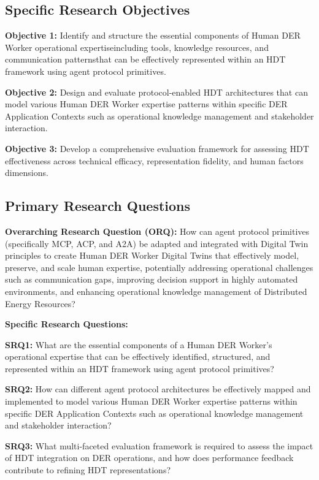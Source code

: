 \documentclass[12pt,a4paper]{article}
\newcommand{\emdash}{\textemdash}
\begin{document}
\subsection{Specific Research Objectives}

\textbf{Objective 1:} Identify and structure the essential components of Human DER Worker operational expertise\emdash{}including tools, knowledge resources, and communication patterns\emdash{}that can be effectively represented within an HDT framework using agent protocol primitives.

\textbf{Objective 2:} Design and evaluate protocol-enabled HDT architectures that can model various Human DER Worker expertise patterns within specific DER Application Contexts such as operational knowledge management and stakeholder interaction.

\textbf{Objective 3:} Develop a comprehensive evaluation framework for assessing HDT effectiveness across technical efficacy, representation fidelity, and human factors dimensions.

\subsection{Primary Research Questions}

\textbf{Overarching Research Question (ORQ):} How can agent protocol primitives (specifically MCP, ACP, and A2A) be adapted and integrated with Digital Twin principles to create Human DER Worker Digital Twins that effectively model, preserve, and scale human expertise, potentially addressing operational challenges such as communication gaps, improving decision support in highly automated environments, and enhancing operational knowledge management of Distributed Energy Resources?

\textbf{Specific Research Questions:}

\textbf{SRQ1:} What are the essential components of a Human DER Worker's operational expertise that can be effectively identified, structured, and represented within an HDT framework using agent protocol primitives?

\textbf{SRQ2:} How can different agent protocol architectures be effectively mapped and implemented to model various Human DER Worker expertise patterns within specific DER Application Contexts such as operational knowledge management and stakeholder interaction?

\textbf{SRQ3:} What multi-faceted evaluation framework is required to assess the impact of HDT integration on DER operations, and how does performance feedback contribute to refining HDT representations?
\end{document}
